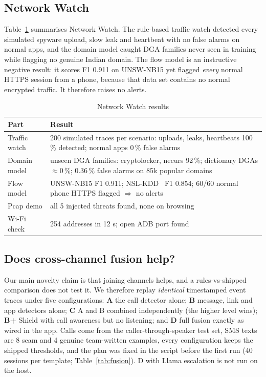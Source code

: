 \documentclass[conference]{IEEEtran}
\begin{document}
\subsection{Network Watch}\label{sec:nw}
Table~\ref{tab:nw} summarises Network Watch. The rule-based traffic watch detected every simulated spyware upload, slow leak and heartbeat with no false alarms on normal apps, and the domain model caught DGA families never seen in training while flagging no genuine Indian domain. The flow model is an instructive negative result: it scores F1 0.911 on UNSW-NB15 yet flagged \emph{every} normal HTTPS session from a phone, because that data set contains no normal encrypted traffic. It therefore raises no alerts.

\begin{table}[t]
\caption{Network Watch results}
\label{tab:nw}
\centering
\footnotesize
\setlength{\tabcolsep}{3pt}
\begin{tabular}{@{}lp{}@{}}
\toprule
Part & Result \\
\midrule
Traffic watch & 200 simulated traces per scenario: uploads, leaks, heartbeats 100\,\% detected; normal apps 0\,\% false alarms \\
Domain model & unseen DGA families: cryptolocker, necurs 92\,\%; dictionary DGAs $\approx$0\,\%; 0.36\,\% false alarms on 85k popular domains \\
Flow model & UNSW-NB15 F1 0.911; NSL-KDD~\cite{nslkdd} F1 0.854; 60/60 normal phone HTTPS flagged $\Rightarrow$ no alerts \\
Pcap demo & all 5 injected threats found, none on browsing \\
Wi-Fi check & 254 addresses in 12 s; open ADB port found \\
\bottomrule
\end{tabular}
\end{table}

\subsection{Does cross-channel fusion help?}\label{sec:fusion}
Our main novelty claim is that joining channels helps, and a rules-vs-shipped comparison does not test it. We therefore replay \emph{identical} timestamped event traces under five configurations: \textbf{A} the call detector alone; \textbf{B} message, link and app detectors alone; \textbf{C} A and B combined independently (the higher level wins); \textbf{B+} Shield with call awareness but no listening; and \textbf{D} full fusion exactly as wired in the app. Calls come from the caller-through-speaker test set, SMS texts are 8 scam and 4 genuine team-written examples, every configuration keeps the shipped thresholds, and the plan was fixed in the script before the first run (40 sessions per template; Table~\ref{tab:fusion}). D with Llama escalation is not run on the host.
\end{document}
